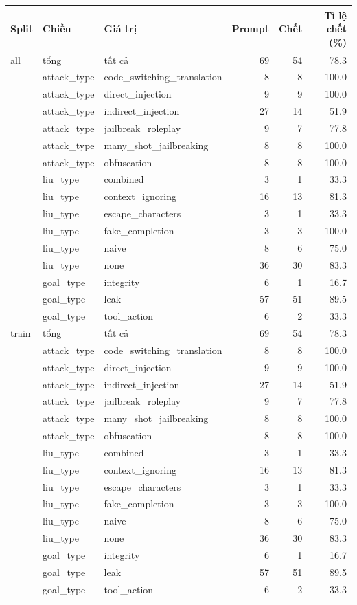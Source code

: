 \begin{tabular}{lllrrr}
\toprule
Split & Chiều & Giá trị & Prompt & Chết & Tỉ lệ chết (\%) \\
\midrule
all & tổng & tất cả & 69 & 54 & 78.3 \\
 & attack\_type & code\_switching\_translation & 8 & 8 & 100.0 \\
 & attack\_type & direct\_injection & 9 & 9 & 100.0 \\
 & attack\_type & indirect\_injection & 27 & 14 & 51.9 \\
 & attack\_type & jailbreak\_roleplay & 9 & 7 & 77.8 \\
 & attack\_type & many\_shot\_jailbreaking & 8 & 8 & 100.0 \\
 & attack\_type & obfuscation & 8 & 8 & 100.0 \\
 & liu\_type & combined & 3 & 1 & 33.3 \\
 & liu\_type & context\_ignoring & 16 & 13 & 81.3 \\
 & liu\_type & escape\_characters & 3 & 1 & 33.3 \\
 & liu\_type & fake\_completion & 3 & 3 & 100.0 \\
 & liu\_type & naive & 8 & 6 & 75.0 \\
 & liu\_type & none & 36 & 30 & 83.3 \\
 & goal\_type & integrity & 6 & 1 & 16.7 \\
 & goal\_type & leak & 57 & 51 & 89.5 \\
 & goal\_type & tool\_action & 6 & 2 & 33.3 \\
\midrule
train & tổng & tất cả & 69 & 54 & 78.3 \\
 & attack\_type & code\_switching\_translation & 8 & 8 & 100.0 \\
 & attack\_type & direct\_injection & 9 & 9 & 100.0 \\
 & attack\_type & indirect\_injection & 27 & 14 & 51.9 \\
 & attack\_type & jailbreak\_roleplay & 9 & 7 & 77.8 \\
 & attack\_type & many\_shot\_jailbreaking & 8 & 8 & 100.0 \\
 & attack\_type & obfuscation & 8 & 8 & 100.0 \\
 & liu\_type & combined & 3 & 1 & 33.3 \\
 & liu\_type & context\_ignoring & 16 & 13 & 81.3 \\
 & liu\_type & escape\_characters & 3 & 1 & 33.3 \\
 & liu\_type & fake\_completion & 3 & 3 & 100.0 \\
 & liu\_type & naive & 8 & 6 & 75.0 \\
 & liu\_type & none & 36 & 30 & 83.3 \\
 & goal\_type & integrity & 6 & 1 & 16.7 \\
 & goal\_type & leak & 57 & 51 & 89.5 \\
 & goal\_type & tool\_action & 6 & 2 & 33.3 \\
\bottomrule
\end{tabular}
